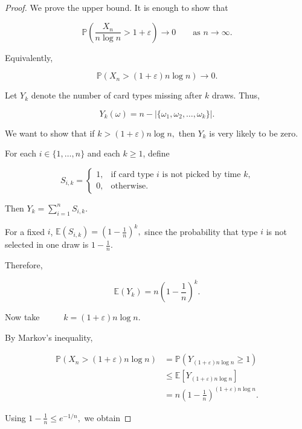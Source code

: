 \begin{proof}
We prove the upper bound. It is enough to show that

\[
    \mathbb{P}
    \left(
        \frac{X_n}{n\log n}>1+\varepsilon
    \right)
    \longrightarrow 0
    \qquad\text{as }n\to\infty.
\]

Equivalently,

\[
    \mathbb{P}
    \left(
        X_n>(1+\varepsilon)n\log n
    \right)
    \longrightarrow 0.
\]

Let $Y_k$ denote the number of card types missing after $k$
draws. Thus,

\[
    Y_k(\omega)
    =
    n-
    \left|
        \{\omega_1,\omega_2,\ldots,\omega_k\}
    \right|.
\]

We want to show that if
\(
    k>(1+\varepsilon)n\log n,
\)
then $Y_k$ is very likely to be zero.

For each $i\in\{1,\ldots,n\}$ and each $k\geq 1$, define

\[
    S_{i,k}
    =
    \begin{cases}
        1,
        & \text{if card type $i$ is not picked by time $k$,}\\
        0,
        & \text{otherwise.}
    \end{cases}
\]

Then
\(
    Y_k
    =
    \sum_{i=1}^n S_{i,k}.
\)

For a fixed $i$,
\(
    \mathbb{E}(S_{i,k})
    =
    \left(1-\frac{1}{n}\right)^k,
\)
since the probability that type $i$ is not selected in one draw is
$1-\frac1n$.

Therefore,

\[
    \mathbb{E}(Y_k)
    =
    n
    \left(1-\frac{1}{n}\right)^k.
\]

Now take ~ ~ ~
\(
    k=(1+\varepsilon)n\log n.
\)

By Markov's inequality,

\[
\begin{aligned}
    \mathbb{P}
    \left(
        X_n>(1+\varepsilon)n\log n
    \right)
    &=
    \mathbb{P}
    \left(
        Y_{(1+\varepsilon)n\log n}\geq 1
    \right) \\
    &\leq
    \mathbb{E}
    \left[
        Y_{(1+\varepsilon)n\log n}
    \right] \\
    &=
    n
    \left(
        1-\frac{1}{n}
    \right)^{(1+\varepsilon)n\log n}.
\end{aligned}
\]

Using
\(
    1-\frac1n\leq e^{-1/n},
\)
we obtain


\end{proof}
